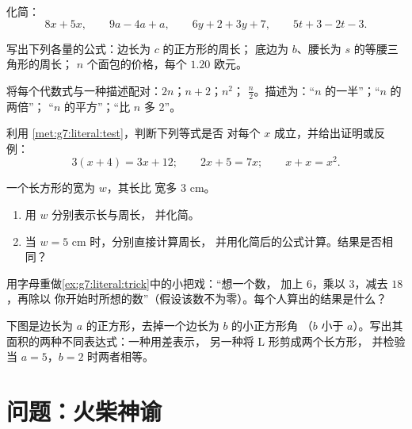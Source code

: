\begin{exercise}[$\star$]\label{exo:g7:literal:5}
化简：
\[
8x + 5x, \qquad
9a - 4a + a, \qquad
6y + 2 + 3y + 7, \qquad
5t + 3 - 2t - 3 .
\]
\end{exercise}

\begin{exercise}[$\star$]\label{exo:g7:literal:6}
写出下列各量的公式：边长为 $c$ 的正方形的周长；
底边为 $b$、腰长为 $s$ 的等腰三角形的周长；
$n$ 个面包的价格，每个 $1.20$ 欧元。
\end{exercise}

\begin{exercise}[$\star$]\label{exo:g7:literal:7}
将每个代数式与一种描述配对：$2n$；$n + 2$；$n^2$；
$\frac n2$。描述为：“$n$ 的一半”；“$n$ 的两倍”；
“$n$ 的平方”；“比 $n$ 多 2”。
\end{exercise}

\begin{exercise}[$\star\star$]\label{exo:g7:literal:8}
利用 \cref{met:g7:literal:test}，判断下列等式是否
对每个 $x$ 成立，并给出证明或反例：
\[
3(x + 4) = 3x + 12; \qquad
2x + 5 = 7x; \qquad
x + x = x^2 .
\]
\end{exercise}

\begin{exercise}[$\star\star$]\label{exo:g7:literal:9}
一个长方形的宽为 $w$，其长比
宽多 $3$ cm。
\begin{enumerate}
  \item 用 $w$ 分别表示长与周长，
        并化简。
  \item 当 $w = 5$ cm 时，分别直接计算周长，
        并用化简后的公式计算。结果是否相同？
\end{enumerate}
\end{exercise}

\begin{exercise}[$\star\star$]\label{exo:g7:literal:10}
用字母重做\cref{ex:g7:literal:trick}中的小把戏：“想一个数，
加上 $6$，乘以 $3$，减去 $18$，再除以
你开始时所想的数”（假设该数不为零）。每个人算出的结果是什么？
\end{exercise}

\begin{exercise}[$\star\star\star$]\label{exo:g7:literal:11}
下图是边长为 $a$ 的正方形，去掉一个边长为 $b$ 的小正方形角
（$b$ 小于 $a$）。写出其面积的两种不同表达式：一种用差表示，
另一种将 L 形剪成两个长方形，
并检验当 $a = 5$，$b = 2$ 时两者相等。
\end{exercise}

\section{问题：火柴神谕}

